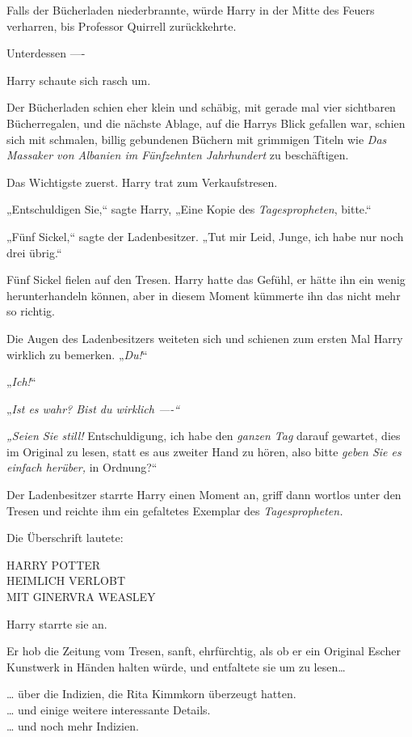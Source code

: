 {Falls der Bücherladen niederbrannte, würde Harry in der Mitte des Feuers verharren, bis Professor Quirrell zurückkehrte.

Unterdessen ----

Harry schaute sich rasch um.

Der Bücherladen schien eher klein und schäbig, mit gerade mal vier sichtbaren Bücherregalen, und die nächste Ablage, auf die Harrys Blick gefallen war, schien sich mit schmalen, billig gebundenen Büchern mit grimmigen Titeln wie \emph{Das Massaker von Albanien im Fünfzehnten Jahrhundert} zu beschäftigen.

Das Wichtigste zuerst. Harry trat zum Verkaufstresen.

„Entschuldigen Sie,“ sagte Harry, „Eine Kopie des \emph{Tagespropheten}, bitte.“

„Fünf Sickel,“ sagte der Ladenbesitzer. „Tut mir Leid, Junge, ich habe nur noch drei übrig.“

Fünf Sickel fielen auf den Tresen. Harry hatte das Gefühl, er hätte ihn ein wenig herunterhandeln können, aber in diesem Moment kümmerte ihn das nicht mehr so richtig.

Die Augen des Ladenbesitzers weiteten sich und schienen zum ersten Mal Harry wirklich zu bemerken. „\emph{Du!}“

„\emph{Ich!}“

„\emph{Ist es wahr? Bist du wirklich ----“}

\emph{„Seien Sie still!} Entschuldigung, ich habe den \emph{ganzen Tag} darauf gewartet, dies im Original zu lesen, statt es aus zweiter Hand zu hören, also bitte \emph{geben Sie es einfach herüber,} in Ordnung?“

Der Ladenbesitzer starrte Harry einen Moment an, griff dann wortlos unter den Tresen und reichte ihm ein gefaltetes Exemplar des \emph{Tagespropheten.}

Die Überschrift lautete:

HARRY POTTER\\ HEIMLICH VERLOBT\\ MIT GINERVRA WEASLEY

Harry starrte sie an.

Er hob die Zeitung vom Tresen, sanft, ehrfürchtig, als ob er ein Original Escher Kunstwerk in Händen halten würde, und entfaltete sie um zu lesen…

… über die Indizien, die Rita Kimmkorn überzeugt hatten.\\ … und einige weitere interessante Details.\\ … und noch mehr Indizien.

}
